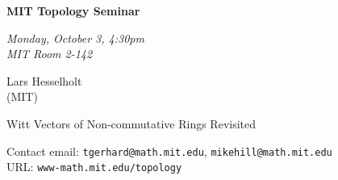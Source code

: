 \documentclass{slides}
\begin{document}
\begin{center}

{\fontsize {54pt}{40pt}\selectfont

\textrm{
{\textbf{MIT Topology Seminar}}}
}
\medskip


{\large\textrm{\emph{Monday, October 3, 4:30pm\\MIT Room 2-142}}}



\bigskip

\textrm{{\LARGE Lars Hesselholt  \\[.5cm](MIT)}}


\textrm{\LARGE Witt Vectors of Non-commutative Rings Revisited}\\

\end{center}

\vspace{1cm}

{\small
\textrm{Contact email: } \texttt{tgerhard@math.mit.edu}, \texttt{mikehill@math.mit.edu}\\
\textrm{URL: } \texttt{www-math.mit.edu/topology}
}
\end{document}
